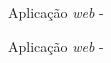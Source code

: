 \begin{frame}{Aplicação \textit{web} - }



\end{frame}

\begin{frame}{Aplicação \textit{web} - }



\end{frame}